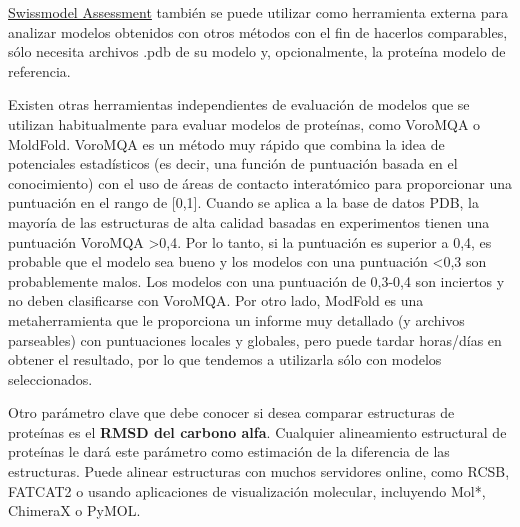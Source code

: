 \href{https://swissmodel.expasy.org/assess}{Swissmodel Assessment} también se puede utilizar como herramienta externa para analizar modelos obtenidos con otros métodos con el fin de hacerlos comparables, sólo necesita archivos .pdb de su modelo y, opcionalmente, la proteína modelo de referencia.

Existen otras herramientas independientes de evaluación de modelos que se utilizan habitualmente para evaluar modelos de proteínas, como VoroMQA o MoldFold. VoroMQA es un método muy rápido que combina la idea de potenciales estadísticos (es decir, una función de puntuación basada en el conocimiento) con el uso de áreas de contacto interatómico para proporcionar una puntuación en el rango de [0,1]. Cuando se aplica a la base de datos PDB, la mayoría de las estructuras de alta calidad basadas en experimentos tienen una puntuación VoroMQA >0,4. Por lo tanto, si la puntuación es superior a 0,4, es probable que el modelo sea bueno y los modelos con una puntuación <0,3 son probablemente malos. Los modelos con una puntuación de 0,3-0,4 son inciertos y no deben clasificarse con VoroMQA. Por otro lado, ModFold es una metaherramienta que le proporciona un informe muy detallado (y archivos parseables) con puntuaciones locales y globales, pero puede tardar horas/días en obtener el resultado, por lo que tendemos a utilizarla sólo con modelos seleccionados.

Otro parámetro clave que debe conocer si desea comparar estructuras de proteínas es el \textbf{RMSD del carbono alfa}. Cualquier alineamiento estructural de proteínas le dará este parámetro como estimación de la diferencia de las estructuras. Puede alinear estructuras con muchos servidores online, como RCSB, FATCAT2 o usando aplicaciones de visualización molecular, incluyendo Mol*, ChimeraX o PyMOL.

